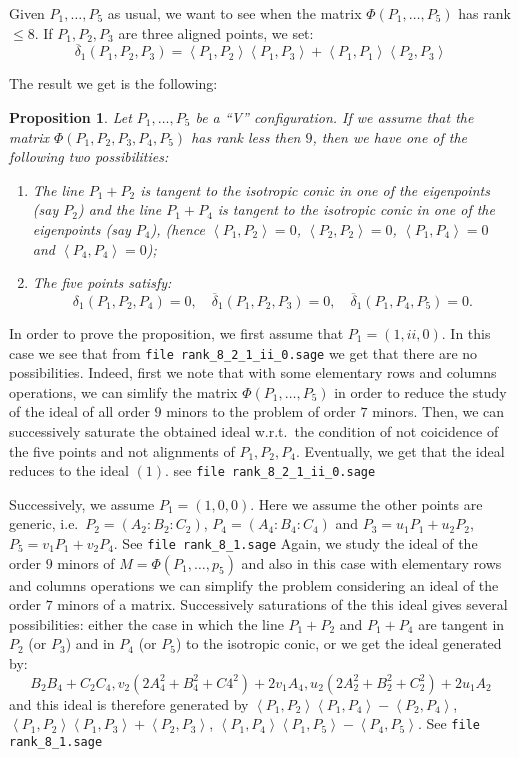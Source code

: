 \documentclass[12pt, a4paper, reqno, captions=tableheading,bibliography=totoc]{scrartcl}
\theoremstyle{plain}
\newtheorem{prop}[lemma]{Proposition}
\theoremstyle{definition}
\newcommand{\scl}[2]{\left\langle {#1}, {#2} \right\rangle}
\begin{document}
Given $P_1, \dots, P_5$ as usual, we want to see when
the matrix $\Phi(P_1, \dots, P_5)$ has rank $\leq 8$.
If $P_1, P_2, P_3$ are three aligned points, we set:
\[
\overline{\delta}_1(P_1, P_2, P_3)  = \scl{P_1}{P_2}\scl{P_1}{P_3}+
\scl{P_1}{P_1}\scl{P_2}{P_3}
\]

The result we get is the following:
\begin{prop}
\label{casoMatrR8}
Let $P_1, \dots, P_5$ be a ``V'' configuration. If we assume that the 
matrix $\Phi(P_1, P_2, P_3, P_4, P_5)$ has rank less then $9$, then we have
one of the following two possibilities:
\begin{enumerate}
\item The line $P_1+P_2$ is tangent to the isotropic conic in one of the
eigenpoints (say $P_2$)
and the line $P_1+P_4$ is tangent to the isotropic conic in one of the
eigenpoints (say $P_4$), 
(hence $\scl{P_1}{P_2} = 0$, $\scl{P_2}{P_2}=0$, $\scl{P_1}{P_4} = 0$
and $\scl{P_4}{P_4}=0$);
\item The five points satisfy:
\[
\delta_1(P_1, P_2, P_4) = 0, \quad \overline{\delta}_1(P_1, P_2, P_3) = 0,
\quad \overline{\delta}_1(P_1, P_4, P_5) = 0.
\]
\end{enumerate}
\end{prop}
In order to prove the proposition, we first assume that $P_1 = (1, ii, 0)$.
In this case we see that from \verb+file rank_8_2_1_ii_0.sage+
we get that there are no possibilities. Indeed, first we note that with some
elementary rows and columns operations, we can simlify the
matrix $\Phi(P_1, \dots, P_5)$ in order to reduce the study of 
the ideal of all order $9$ minors to the problem of order $7$ minors.
Then, we can successively saturate the obtained ideal w.r.t.\ the condition
of not coicidence of the five points and not alignments of $P_1, P_2, P_4$.
Eventually, we get that the ideal reduces to the ideal $(1)$.
see \verb+file rank_8_2_1_ii_0.sage+

Successively, we assume $P_1 = (1, 0, 0)$. Here we assume the other points
are generic, i.e.\ $P_2 = (A_2: B_2: C_2)$, $P_4 = (A_4: B_4: C_4)$
and $P_3=u_1P_1+u_2P_2$, $P_5 = v_1P_1+v_2P_4$.
See \verb+file rank_8_1.sage+
Again, we study the ideal of the
order $9$ minors of $M = \Phi(P_1, \dots, p_5)$ and also in this case
with elementary rows and columns operations we can simplify the problem
considering an ideal of the order $7$ minors of a matrix. Successively
saturations of the this ideal gives several possibilities: either the case
in which the line $P_1+P_2$ and $P_1+P_4$ are tangent in $P_2$ (or $P_3$)
and in $P_4$ (or $P_5$) to the isotropic conic, or we get the ideal generated
by:
\[
B_2B_4 + C_2C_4, v_2(2A_4^2 + B_4^2 + C4^2) + 2v_1A_4, u_2(2A_2^2+B_2^2+C_2^2)
+ 2u_1A_2
\]
and this ideal is therefore generated by
$\scl{P_1}{P_2}\scl{P_1}{P_4}-\scl{P_2}{P_4}$,
$\scl{P_1}{P_2}\scl{P_1}{P_3}+\scl{P_2}{P_3}$,
$\scl{P_1}{P_4}\scl{P_1}{P_5}-\scl{P_4}{P_5}$.
See \verb+file rank_8_1.sage+
\end{document}
